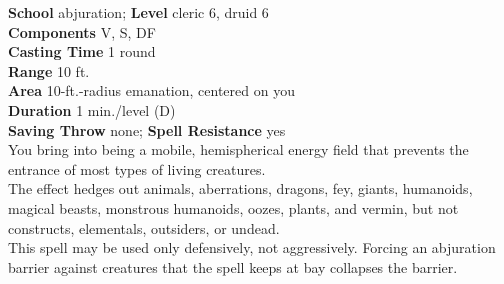 \textbf{School} abjuration; \textbf{Level} cleric 6, druid 6\\
\textbf{Components} V, S, DF\\
\textbf{Casting Time} 1 round\\
\textbf{Range} 10 ft.\\
\textbf{Area} 10-ft.-radius emanation, centered on you\\
\textbf{Duration} 1 min./level (D)\\
\textbf{Saving Throw} none; \textbf{Spell Resistance} yes\\
You bring into being a mobile, hemispherical energy field that prevents the entrance of most types of living creatures.\\
The effect hedges out animals, aberrations, dragons, fey, giants, humanoids, magical beasts, monstrous humanoids, oozes, plants, and vermin, but not constructs, elementals, outsiders, or undead.\\
This spell may be used only defensively, not aggressively. Forcing an abjuration barrier against creatures that the spell keeps at bay collapses the barrier.\\
